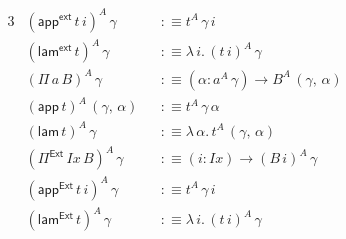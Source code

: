 \documentclass[12pt,a4paper,twoside,openany]{book}
\theoremstyle{remark}
\theoremstyle{definition}
\theoremstyle{theorem}
\newcommand{\mi}[1]{\mathit{#1}}
\newcommand{\ms}[1]{\mathsf{#1}}
\newcommand{\Pie}{\Pi^{\mathsf{Ext}}}
\newcommand{\appe}{\mathsf{app^{Ext}}}
\newcommand{\lame}{\mathsf{lam^{Ext}}}
\newcommand{\appinf}{\mathsf{app^{ext}}}
\newcommand{\laminf}{\mathsf{lam^{ext}}}
\newcommand{\app}{\ms{app}}
\newcommand{\lam}{\ms{lam}}
\newcommand{\defn}{:\equiv}
\begin{document}
\begin{alignat*}{3}
  &(\appinf\,t\,i)^A\,\gamma &&\defn t^A\,\gamma\,i\\
  &(\laminf\,t)^A\,\gamma &&\defn \lambda\,i.\,(t\,i)^A\,\gamma\\
  &(\Pi\,a\,B)^A\,\gamma &&\defn (\alpha : a^A\,\gamma) \to B^A\,(\gamma,\,\alpha)\\
  &(\app\,t)^A\,(\gamma,\,\alpha) &&\defn t^A\,\gamma\,\alpha\\
  &(\lam\,t)^A\,\gamma &&\defn \lambda\,\alpha.\,t^A\,(\gamma,\,\alpha)\\
  &(\Pie\,\mi{Ix}\,B)^A\,\gamma &&\defn (i : \mi{Ix}) \to (B\,i)^A\,\gamma\\
  &(\appe\,t\,i)^A\,\gamma &&\defn t^A\,\gamma\,i\\
  &(\lame\,t)^A\,\gamma &&\defn \lambda\,i.\,(t\,i)^A\,\gamma
\end{alignat*}
\end{document}
